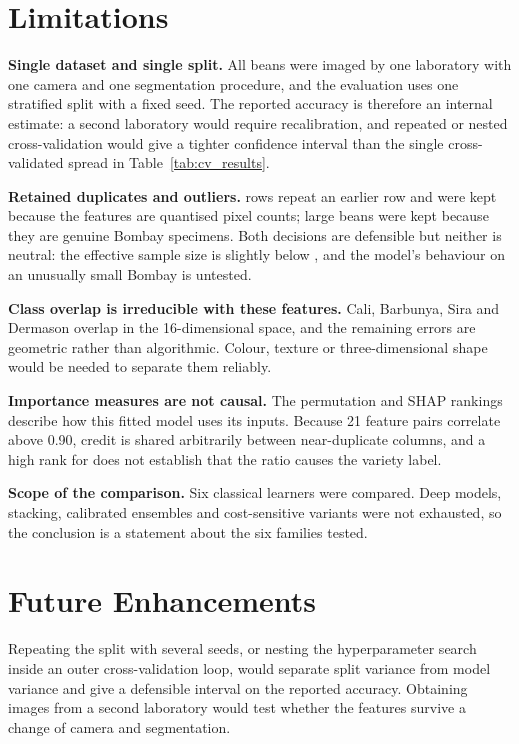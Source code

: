 \section{Limitations}

\textbf{Single dataset and single split.} All beans were imaged by one laboratory
with one camera and one segmentation procedure, and the evaluation uses one
stratified split with a fixed seed. The reported accuracy is therefore an internal
estimate: a second laboratory would require recalibration, and repeated or nested
cross-validation would give a tighter confidence interval than the single
cross-validated spread in Table~\ref{tab:cv_results}.

\textbf{Retained duplicates and outliers.} \DuplicateRows{} rows repeat an earlier
row and were kept because the features are quantised pixel counts; large beans were
kept because they are genuine Bombay specimens. Both decisions are defensible but
neither is neutral: the effective sample size is slightly below \DatasetRows{}, and
the model's behaviour on an unusually small Bombay is untested.

\textbf{Class overlap is irreducible with these features.} Cali, Barbunya, Sira and
Dermason overlap in the 16-dimensional space, and the remaining errors are
geometric rather than algorithmic. Colour, texture or three-dimensional shape would
be needed to separate them reliably.

\textbf{Importance measures are not causal.} The permutation and SHAP rankings
describe how this fitted model uses its inputs. Because 21 feature pairs correlate
above 0.90, credit is shared arbitrarily between near-duplicate columns, and a high
rank for \TopPermFeature{} does not establish that the ratio causes the variety
label.

\textbf{Scope of the comparison.} Six classical learners were compared. Deep
models, stacking, calibrated ensembles and cost-sensitive variants were not
exhausted, so the conclusion is a statement about the six families tested.

\section{Future Enhancements}

Repeating the split with several seeds, or nesting the hyperparameter search
inside an outer cross-validation loop, would separate split variance from model
variance and give a defensible interval on the reported accuracy. Obtaining images
from a second laboratory would test whether the features survive a change of camera
and segmentation.

